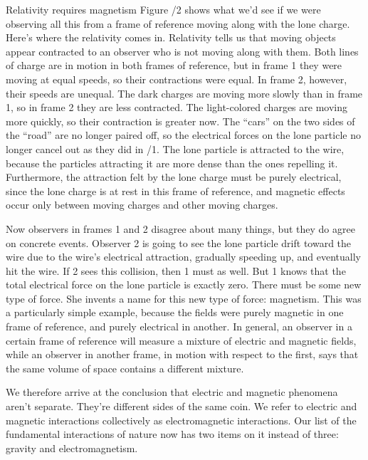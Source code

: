 \begin{envsubsection}{Relativity requires magnetism}
	Figure /2
        shows what we'd see if we were observing all this from a frame of reference moving
	along with the lone charge.
	Here's where the relativity comes in. Relativity tells us that moving objects
	appear contracted to an observer who is not moving along with them.
	Both lines of charge are in motion in both frames of reference, but in frame 1
	they were moving at equal speeds, so their contractions were equal.
	In frame 2, however, their speeds are unequal. The dark
	charges are moving more slowly than in frame 1, so in frame 2 they are less contracted.
	The light-colored charges are moving more quickly, so their contraction is greater now.
	The ``cars'' on the two sides of the ``road'' are no longer paired off, so the electrical
	forces on the lone particle no longer cancel out as they did in /1.
	The lone particle is attracted to the wire, because the particles attracting it are more
	dense than the ones repelling it. Furthermore, the attraction felt
	by the lone charge must be purely electrical, since the lone charge is at rest in this
	frame of reference, and magnetic effects occur only between moving charges and other
	moving charges.

	Now observers in frames 1 and 2 disagree about many things, but they do agree on
	concrete events. Observer 2 is going to see the lone particle drift toward the wire
	due to the wire's electrical attraction, gradually speeding up, and eventually hit
	the wire. If 2 sees this collision, then 1 must as well. But 1 knows that the total
	electrical force on the lone particle is exactly zero. There must be some new type
	of force. She invents a name for this new type of force: magnetism. This was a particularly
	simple example, because the fields were purely magnetic in one frame of reference, and
	purely electrical in another. In general, an observer in a certain frame of reference
	will measure a mixture of electric and magnetic fields, while an observer in another
	frame, in motion with respect to the first, says that the same volume of space contains a different mixture.

We therefore arrive at the conclusion that electric and magnetic phenomena aren't
separate. They're different sides of the same coin. We refer to electric and magnetic interactions
collectively as electromagnetic interactions. Our list of the fundamental interactions
of nature now has two items on it instead of three: gravity and electromagnetism.


\end{envsubsection}
